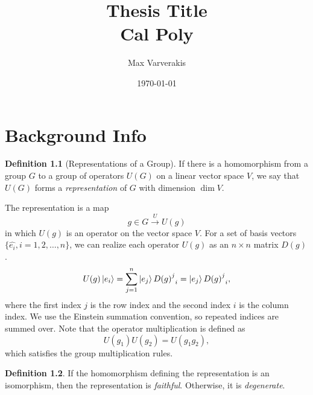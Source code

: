 \documentclass[12pt]{report}
\title{
{Thesis Title}\\
{\large Cal Poly}\\
}
\author{Max Varverakis}
\date{\today}
\theoremstyle{definition}
\newtheorem{definition}{Definition}[chapter]
\begin{document}
\maketitle

\chapter{Background Info}

\begin{definition}[Representations of a Group]
    If there is a homomorphism from a group $G$ to a group of operators $U(G)$ on a linear vector space $V$, we say that $U(G)$ forms a \textit{representation} of $G$ with dimension $\dim V$.
\end{definition}

The representation is a map
\begin{equation}
    g\in G\xrightarrow{U} U(g)
\end{equation}
in which $U(g)$ is an operator on the vector space $V$. For a set of basis vectors $\{\hat{e_i},i=1,2,\dots,n\}$, we can realize each operator $U(g)$ as an $n\times n$ matrix $D(g)$.
\begin{equation}
    U(g)\ket{e_i} = \sum_{j=1}^n \ket{e_j}{{D(g)}^j}_i = \ket{e_j}{{D(g)}^j}_i,
\end{equation}
where the first index $j$ is the row index and the second index $i$ is the column index. We use the Einstein summation convention, so repeated indices are summed over. Note that the operator multiplication is defined as
\begin{equation}
    U(g_1)U(g_2) = U(g_1g_2),
\end{equation}
which satisfies the group multiplication rules.

\begin{definition}
    If the homomorphism defining the representation is an isomorphism, then the representation is \textit{faithful}. Otherwise, it is \textit{degenerate}.
\end{definition}
\end{document}
